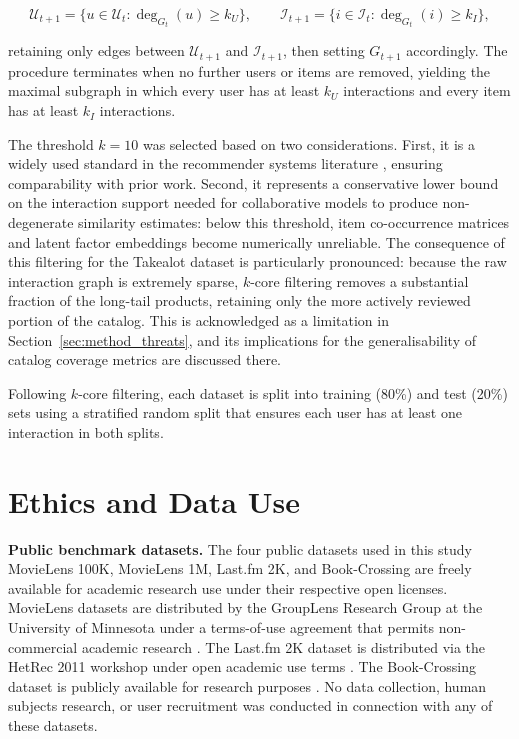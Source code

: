 \documentclass[11pt,a4paper]{report}
\begin{document}
\begin{equation}
  \mathcal{U}_{t+1} = \bigl\{ u \in \mathcal{U}_t : \deg_{G_t}(u) \ge k_U \bigr\}, \qquad
  \mathcal{I}_{t+1} = \bigl\{ i \in \mathcal{I}_t : \deg_{G_t}(i) \ge k_I \bigr\},
\end{equation}

retaining only edges between $\mathcal{U}_{t+1}$ and $\mathcal{I}_{t+1}$, then setting $G_{t+1}$ accordingly. The procedure terminates when no further users or items are removed, yielding the maximal subgraph in which every user has at least $k_U$ interactions and every item has at least $k_I$ interactions.

The threshold $k = 10$ was selected based on two considerations. First, it is a widely used standard in the recommender systems literature \citep{he2020lightgcn, wang2019ngcf}, ensuring comparability with prior work. Second, it represents a conservative lower bound on the interaction support needed for collaborative models to produce non-degenerate similarity estimates: below this threshold, item co-occurrence matrices and latent factor embeddings become numerically unreliable. The consequence of this filtering for the Takealot dataset is particularly pronounced: because the raw interaction graph is extremely sparse, $k$-core filtering removes a substantial fraction of the long-tail products, retaining only the more actively reviewed portion of the catalog. This is acknowledged as a limitation in Section~\ref{sec:method_threats}, and its implications for the generalisability of catalog coverage metrics are discussed there.

Following $k$-core filtering, each dataset is split into training (80\%) and test (20\%) sets using a stratified random split that ensures each user has at least one interaction in both splits.

\section{Ethics and Data Use}
\label{sec:method_ethics}

\textbf{Public benchmark datasets.} The four public datasets used in this study MovieLens 100K, MovieLens 1M, Last.fm 2K, and Book-Crossing are freely available for academic research use under their respective open licenses. MovieLens datasets are distributed by the GroupLens Research Group at the University of Minnesota under a terms-of-use agreement that permits non-commercial academic research \citep{harper2015movielens}. The Last.fm 2K dataset is distributed via the HetRec 2011 workshop under open academic use terms \citep{cantador2011second}. The Book-Crossing dataset is publicly available for research purposes \citep{ziegler2005improving}. No data collection, human subjects research, or user recruitment was conducted in connection with any of these datasets.
\end{document}
